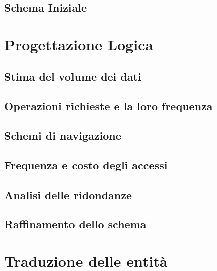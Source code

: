 \documentclass{article}
\begin{document}
\subsection{Schema Iniziale}





\section{Progettazione Logica}

\subsection{Stima del volume dei dati}


\subsection{Operazioni richieste e la loro frequenza}


\subsection{Schemi di navigazione}


\subsection{Frequenza e costo degli accessi}

\subsection{Analisi delle ridondanze}


\subsection{Raffinamento dello schema} %


\section{Traduzione delle entità}

\end{document}
